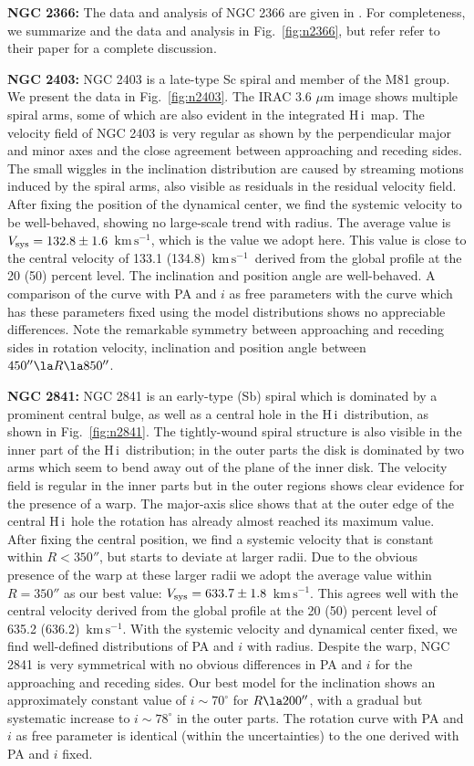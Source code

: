 \documentclass[usenatbib,usegraphicx,apjfonts,floatfix]{emulateapj}
\newcommand{\kms}{\ensuremath{\,\mbox{km}\,\mbox{s}^{-1}}}
\newcommand{\HI}{H\,{\sc i}}
\begin{document}
{\bf NGC 2366:} The data and analysis of NGC 2366 are given in
\citet{oh2007}. For completeness, we summarize and the data and
analysis in Fig.~\ref{fig:n2366}, but refer refer to their paper for a
complete discussion.

{\bf NGC 2403:} NGC 2403 is a late-type Sc spiral and member of the
M81 group.  We present the data in Fig.~\ref{fig:n2403}.  The IRAC 3.6
$\mu$m image shows multiple spiral arms, some of which are also
evident in the integrated \HI\ map.  The velocity field of NGC 2403 is
very regular as shown by the perpendicular major and minor axes and
the close agreement between approaching and receding sides. The small
wiggles in the inclination distribution are caused by streaming
motions induced by the spiral arms, also visible as residuals in the
residual velocity field.
After fixing the position of the dynamical center, we find the
systemic velocity to be well-behaved, showing no large-scale trend
with radius. The average value is $V_{\rm sys}=132.8 \pm 1.6$ \kms,
which is the value we adopt here. This value is close to the central
velocity of 133.1 (134.8) \kms\ derived from the global profile at the
20 (50) percent level.  The inclination and position angle are
well-behaved. A comparison of the curve with PA and $i$ as free
parameters with the curve which has these parameters fixed using the
model distributions shows no appreciable differences.  Note the
remarkable symmetry between approaching and receding sides in rotation
velocity, inclination and position angle between $450'' \la R \la
850''$.

{\bf NGC 2841:} NGC 2841 is an early-type (Sb) spiral which is
dominated by a prominent central bulge, as well as a central hole in
the \HI\ distribution, as shown in Fig.~\ref{fig:n2841}.  The
tightly-wound spiral structure is also visible in the inner part of
the \HI\ distribution; in the outer parts the disk is dominated by two
arms which seem to bend away out of the plane of the inner disk.  The
velocity field is regular in the inner parts but in the outer regions
shows clear evidence for the presence of a warp. The major-axis slice
shows that at the outer edge of the central \HI\ hole the rotation has
already almost reached its maximum value.
After fixing the central position, we find a systemic velocity that is
constant within $R<350''$, but starts to deviate at larger radii. Due
to the obvious presence of the warp at these larger radii we adopt the
average value within $R= 350''$ as our best value: $V_{\rm sys} =
633.7 \pm 1.8$ \kms. This agrees well with the central velocity
derived from the global profile at the 20 (50) percent level of 635.2
(636.2) \kms.
With the systemic velocity and dynamical center fixed, we find
well-defined distributions of PA and $i$ with radius. Despite the
warp, NGC 2841 is very symmetrical with no obvious differences in PA
and $i$ for the approaching and receding sides. Our best model for the
inclination shows an approximately constant value of $i \sim
70^{\circ}$ for $R \la 200''$, with a gradual but systematic increase
to $i \sim 78^{\circ}$ in the outer parts.  The rotation curve with PA
and $i$ as free parameter is identical (within the uncertainties) to
the one derived with PA and $i$ fixed.
\end{document}
